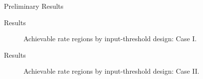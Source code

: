 \documentclass[9pt]{beamer}
\begin{document}
\begin{section}{Preliminary Results}
		\begin{frame}{Results}
			\begin{figure}[!t]
				\centering
				\caption{Achievable rate regions by input-threshold design: Case I.}
				\label{fi:rate_region_1}
			\end{figure}
		\end{frame}

		\begin{frame}{Results}
			\begin{figure}[!t]
				\centering
				\caption{Achievable rate regions by input-threshold design: Case II.}
				\label{fi:rate_region_2}
			\end{figure}
		\end{frame}
	\end{section}

	
	
\end{document}
